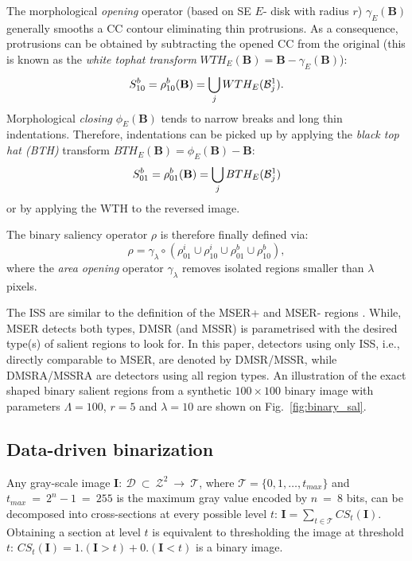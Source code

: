 \documentclass[conference,compsoc]{IEEEtran}
\newcommand {\be}{\begin{equation}}
\newcommand {\ee}{\end{equation}}
\def\B{{\mathbf B}}
\def\I{{\mathbf I}}
\def\mcT{{\mathcal{T}}}
\def\mcD{{\mathcal{D}}}
\def\S{{\mathbf S}}
\begin{document}
The morphological {\em opening} operator (based on SE
$E$- disk with radius $r$)  $\gamma_E(\B)$ generally smooths a CC contour 
eliminating thin protrusions. As a consequence, protrusions can be obtained by subtracting the opened CC
from the original (this is known as the {\it white tophat
transform} $WTH_E(\B) = \B - \gamma_E(\B)$):
\be
S^b_{10} = \rho^b_{10}(\B)=   \bigcup_j WTH_E({\cal B}_j^1) \label{eqn:sal:bor:10}.
\ee
Morphological {\em closing} $\phi_{E}(\B)$ tends to narrow breaks and long thin indentations.
Therefore, indentations can be picked up by applying the {\em black top hat (BTH)} transform  $BTH_E(\B) = \phi_E(\B) - \B$:
\be
S^b_{01} = \rho^b_{01}(\B)=  \bigcup_j BTH_E({\cal B}_j^1) \label{eqn:sal:bor:01}
\ee
or by applying the WTH to the reversed image.

The binary saliency operator $\rho$ is therefore finally defined via:
\be
\rho = \gamma_\lambda \circ (\rho^i_{01} \cup\rho^i_{10} \cup
\rho^b_{01} \cup \rho^b_{10}),
\ee
where the  {\em area opening} operator  $\gamma_{\lambda}$ removes isolated regions smaller than $\lambda$ pixels.

The ISS are similar to the definition of the MSER+ and MSER- regions \cite{Matas2002BMVC}. While, MSER detects both types, DMSR (and MSSR) is parametrised with the desired type(s) of salient regions to look for. In this paper, detectors using only ISS, i.e., directly comparable to MSER, are denoted by DMSR/MSSR, while DMSRA/MSSRA are detectors using all region types. An illustration of the exact shaped binary salient 
regions from a synthetic $100 \times 100$ binary image with parameters $\Lambda=100$, $r=5$ and $\lambda = 10$ are shown on Fig.~\ref{fig:binary_sal}.



\subsection{Data-driven binarization}
\label{ssec:binarize}
Any gray-scale image  $\I:~\mcD~\subset~\mathcal{Z}^2~\rightarrow ~\mcT $, where $\mcT=\{0,1,\ldots, t_{max}\}$ and $t_{max}~=~2^n-1~=~255$ is the maximum gray value encoded by $n~=~8$ bits, can be decomposed into cross-sections at
every possible level $t$:  $\I = \sum_{t \in \mcT}CS_t(\I)$. Obtaining a section at level $t$ is equivalent to thresholding the image at threshold $t$: $CS_t(\I)= 1.(\I>t) + 0.(\I<t)$ is a binary image. 
\end{document}
